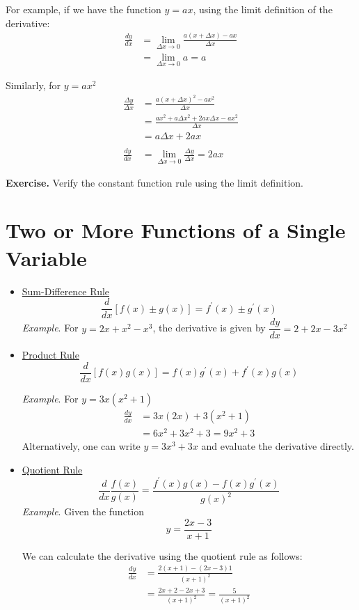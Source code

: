 \documentclass{./../../latex/handout}
\begin{document}
For {example}, if we have the function $y=ax$, using the limit definition of the derivative: 
\[ \begin{aligned} \frac{d y}{d x} &=\lim _{\Delta x \rightarrow 0} \frac{a(x+\Delta x)-a x}{\Delta x} \\ &=\lim _{\Delta x \rightarrow 0} a=a \end{aligned} \]

Similarly, for $y=ax^2$
\[
\begin{aligned}
\frac{\Delta y}{\Delta x} &=\frac{a(x+\Delta x)^{2}-a x^{2}}{\Delta x} \\
&=\frac{a x^{2}+a \Delta x^{2}+2 a x \Delta x-a x^{2}}{\Delta x} \\
&=a \Delta x+2a x \\~\\
\frac{d y}{d x}&=\lim _{\Delta x \rightarrow 0} \frac{\Delta y}{\Delta x} =2 ax
\end{aligned}
\]

\textbf{Exercise.} Verify the constant function rule using the limit definition.

\newpage
\section*{Two or More Functions of a Single Variable}
\begin{itemize}
\item \underline{Sum-Difference Rule}
\[ \frac{d}{d x}[f(x) \pm g(x)]=f^{\prime}(x) \pm g^{\prime}(x) \]
\textit{Example}. For $y=2x+x^2- x^{3}$, the derivative is given by $ \dfrac{d y}{d x}=2+2x-3x^2 $ \\

\item \underline{Product Rule}
\[
\frac{d}{d x}[f(x) g(x)]=f(x) g^{\prime}(x)+f^{\prime}(x) g(x)
\] 

\textit{Example}. For  \( y =3 x\left(x^{2}+1\right) \)\\
\[
\begin{aligned}
\frac{dy}{d x} &=3 x(2 x)+3\left(x^{2}+1\right) \\
&=6 x^{2}+3x^2+3 = 9 x^2+3
\end{aligned}
\]
Alternatively, one can write \( y =3x^3+3x \) and evaluate the derivative directly. \\
\item \underline{Quotient Rule}
\[ \frac{d}{d x} \frac{f(x)}{g(x)}=\frac{f^{\prime}(x) g(x)-f(x) g^{\prime}(x)}{g(x)^2} \]
\textit{Example}. Given the function \[
y=\frac{2 x-3}{x+1}
\]

We can calculate the derivative using the quotient rule as follows:
\[
\begin{aligned}
\frac{d y}{d x} &=\frac{2(x+1)-(2 x-3) 1}{(x+1)^{2}} \\
&=\frac{2 x+2-2 x+3}{(x+1)^{2}}=\frac{5}{(x+1)^{2}}
\end{aligned}
\]
\end{itemize}
\end{document}

